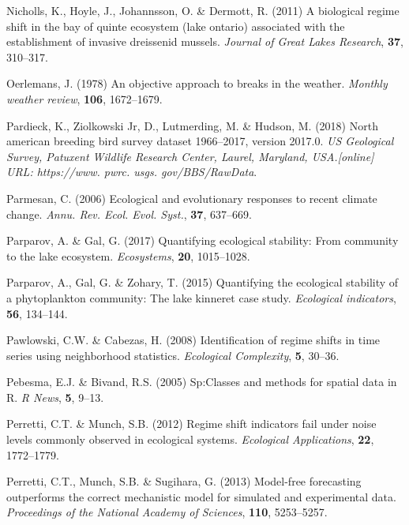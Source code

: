 \documentclass[print]{nuthesis}
\begin{document}
\leavevmode\hypertarget{ref-nicholls2011biological}{}%
Nicholls, K., Hoyle, J., Johannsson, O. \& Dermott, R. (2011) A biological regime shift in the bay of quinte ecosystem (lake ontario) associated with the establishment of invasive dreissenid mussels. \emph{Journal of Great Lakes Research}, \textbf{37}, 310--317.

\leavevmode\hypertarget{ref-oerlemans1978objective}{}%
Oerlemans, J. (1978) An objective approach to breaks in the weather. \emph{Monthly weather review}, \textbf{106}, 1672--1679.

\leavevmode\hypertarget{ref-pardieck2018north}{}%
Pardieck, K., Ziolkowski Jr, D., Lutmerding, M. \& Hudson, M. (2018) North american breeding bird survey dataset 1966--2017, version 2017.0. \emph{US Geological Survey, Patuxent Wildlife Research Center, Laurel, Maryland, USA.{[}online{]} URL: https://www. pwrc. usgs. gov/BBS/RawData}.

\leavevmode\hypertarget{ref-parmesan_ecological_2006}{}%
Parmesan, C. (2006) Ecological and evolutionary responses to recent climate change. \emph{Annu. Rev. Ecol. Evol. Syst.}, \textbf{37}, 637--669.

\leavevmode\hypertarget{ref-parparov2017quantifying}{}%
Parparov, A. \& Gal, G. (2017) Quantifying ecological stability: From community to the lake ecosystem. \emph{Ecosystems}, \textbf{20}, 1015--1028.

\leavevmode\hypertarget{ref-parparov2015quantifying}{}%
Parparov, A., Gal, G. \& Zohary, T. (2015) Quantifying the ecological stability of a phytoplankton community: The lake kinneret case study. \emph{Ecological indicators}, \textbf{56}, 134--144.

\leavevmode\hypertarget{ref-pawlowski_identification_2008}{}%
Pawlowski, C.W. \& Cabezas, H. (2008) Identification of regime shifts in time series using neighborhood statistics. \emph{Ecological Complexity}, \textbf{5}, 30--36.

\leavevmode\hypertarget{ref-sp}{}%
Pebesma, E.J. \& Bivand, R.S. (2005) Sp:Classes and methods for spatial data in R. \emph{R News}, \textbf{5}, 9--13.

\leavevmode\hypertarget{ref-perretti2012regime}{}%
Perretti, C.T. \& Munch, S.B. (2012) Regime shift indicators fail under noise levels commonly observed in ecological systems. \emph{Ecological Applications}, \textbf{22}, 1772--1779.

\leavevmode\hypertarget{ref-perretti_model-free_2013}{}%
Perretti, C.T., Munch, S.B. \& Sugihara, G. (2013) Model-free forecasting outperforms the correct mechanistic model for simulated and experimental data. \emph{Proceedings of the National Academy of Sciences}, \textbf{110}, 5253--5257.
\end{document}
